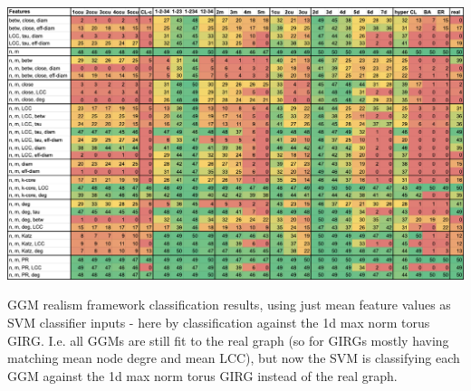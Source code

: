\begin{table}
    \centering
    \includegraphics[width=\textwidth]{./figures/blasius_framework_means_1d_base.png}
    \caption{GGM realism framework classification results, using just mean feature values as SVM classifier inputs -  here by classification against the 1d max norm torus GIRG. I.e. all GGMs are still fit to the real graph (so for GIRGs mostly having matching mean node degre and mean LCC), but now the SVM is classifying each GGM against the 1d max norm torus GIRG instead of the real graph.}
    \label{fig:blasius_framework_means_1d_base}
\end{table}